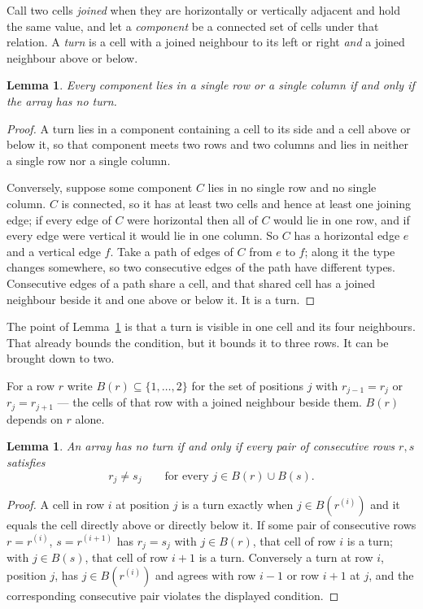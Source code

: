 \documentclass[11pt,a4paper]{article}
\theoremstyle{plain}
\newtheorem{lemma}[theorem]{Lemma}
\theoremstyle{definition}
\begin{document}
Call two cells \emph{joined} when they are horizontally or vertically adjacent and hold the same value, and let a \emph{component} be a connected set of cells under that relation. A \emph{turn} is a cell with a joined neighbour to its left or right \emph{and} a joined neighbour above or below.

\begin{lemma}\label{lem:turn}
Every component lies in a single row or a single column if and only if the array has no turn.
\end{lemma}

\begin{proof}
A turn lies in a component containing a cell to its side and a cell above or below it, so that component meets two rows and two columns and lies in neither a single row nor a single column.

Conversely, suppose some component $C$ lies in no single row and no single column. $C$ is connected, so it has at least two cells and hence at least one joining edge; if every edge of $C$ were horizontal then all of $C$ would lie in one row, and if every edge were vertical it would lie in one column. So $C$ has a horizontal edge $e$ and a vertical edge $f$. Take a path of edges of $C$ from $e$ to $f$; along it the type changes somewhere, so two consecutive edges of the path have different types. Consecutive edges of a path share a cell, and that shared cell has a joined neighbour beside it and one above or below it. It is a turn.
\end{proof}

The point of Lemma~\ref{lem:turn} is that a turn is visible in one cell and its four neighbours. That already bounds the condition, but it bounds it to three rows. It can be brought down to two.

For a row $r$ write $B(r)\subseteq\{1,\dots,2\}$ for the set of positions $j$ with $r_{j-1}=r_j$ or $r_j=r_{j+1}$ --- the cells of that row with a joined neighbour beside them. $B(r)$ depends on $r$ alone.

\begin{lemma}\label{lem:pair}
An array has no turn if and only if every pair of consecutive rows $r,s$ satisfies
\[ r_j \neq s_j \qquad\text{for every } j \in B(r)\cup B(s). \]
\end{lemma}

\begin{proof}
A cell in row $i$ at position $j$ is a turn exactly when $j\in B(r^{(i)})$ and it equals the cell directly above or directly below it. If some pair of consecutive rows $r=r^{(i)}$, $s=r^{(i+1)}$ has $r_j=s_j$ with $j\in B(r)$, that cell of row $i$ is a turn; with $j\in B(s)$, that cell of row $i+1$ is a turn. Conversely a turn at row $i$, position $j$, has $j\in B(r^{(i)})$ and agrees with row $i-1$ or row $i+1$ at $j$, and the corresponding consecutive pair violates the displayed condition.
\end{proof}
\end{document}
